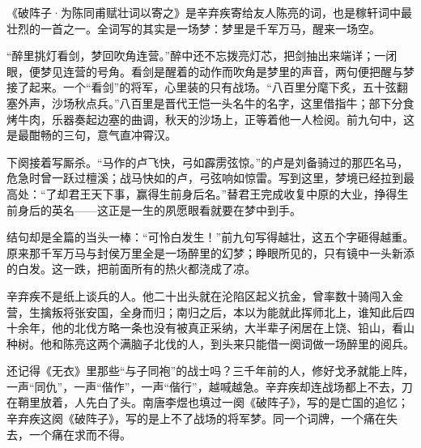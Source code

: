 \begin{appreciation}
《破阵子·为陈同甫赋壮词以寄之》是辛弃疾寄给友人陈亮的词，也是稼轩词中最壮烈的一首之一。全词写的其实是一场梦：梦里是千军万马，醒来一场空。

“醉里挑灯看剑，梦回吹角连营。”醉中还不忘拨亮灯芯，把剑抽出来端详；一闭眼，便梦见连营的号角。看剑是醒着的动作而吹角是梦里的声音，两句便把醒与梦接了起来。一个“看剑”的将军，心里装的只有战场。“八百里分麾下炙，五十弦翻塞外声，沙场秋点兵。”八百里是晋代王恺一头名牛的名字，这里借指牛；部下分食烤牛肉，乐器奏起边塞的曲调，秋天的沙场上，正等着他一人检阅。前九句中，这是最酣畅的三句，意气直冲霄汉。

下阕接着写厮杀。“马作的卢飞快，弓如霹雳弦惊。”的卢是刘备骑过的那匹名马，危急时曾一跃过檀溪；战马快如的卢，弓弦响如惊雷。写到这里，梦境已经拉到最高处：“了却君王天下事，赢得生前身后名。”替君王完成收复中原的大业，挣得生前身后的英名——这正是一生的夙愿眼看就要在梦中到手。

结句却是全篇的当头一棒：“可怜白发生！”前九句写得越壮，这五个字砸得越重。原来那千军万马与封侯万里全是一场醉里的幻梦；睁眼所见的，只有镜中一头新添的白发。这一跌，把前面所有的热火都浇成了凉。

辛弃疾不是纸上谈兵的人。他二十出头就在沦陷区起义抗金，曾率数十骑闯入金营，生擒叛将张安国，全身而归；南归之后，本以为能就此挥师北上，谁知此后四十余年，他的北伐方略一条也没有被真正采纳，大半辈子闲居在上饶、铅山，看山种树。他和陈亮这两个满脑子北伐的人，到头来只能借一阕词做一场醉里的阅兵。

还记得《无衣》里那些“与子同袍”的战士吗？三千年前的人，修好戈矛就能上阵，一声“同仇”，一声“偕作”，一声“偕行”，越喊越急。辛弃疾却连战场都上不去，刀在鞘里放着，人先白了头。南唐李煜也填过一阕《破阵子》，写的是亡国的追忆；辛弃疾这阕《破阵子》，写的是上不了战场的将军梦。同一个词牌，一个痛在失去，一个痛在求而不得。
\end{appreciation}
